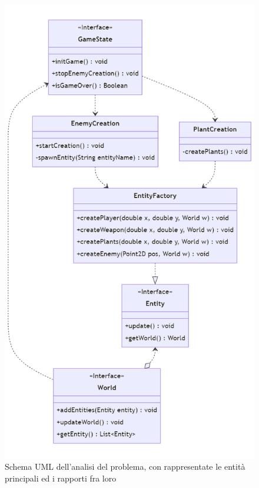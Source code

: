 \documentclass[a4paper,12pt]{report}
\begin{document}
\begin{figure}[H]
\centering{}
\includegraphics[width=\textwidth,height=\textheight,keepaspectratio]{img/AnalysisUML.png}
\caption{Schema UML dell'analisi del problema, con rappresentate le entità principali ed i rapporti fra loro}
\label{img:analysisScheme}
\end{figure}

\end{document}
